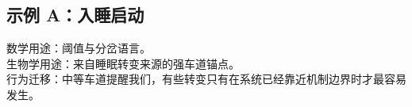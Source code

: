 \subsection*{示例 A：入睡启动}

数学用途：阈值与分岔语言。\\
生物学用途：来自睡眠转变来源的强车道锚点。\\
行为迁移：中等车道提醒我们，有些转变只有在系统已经靠近机制边界时才最容易发生。